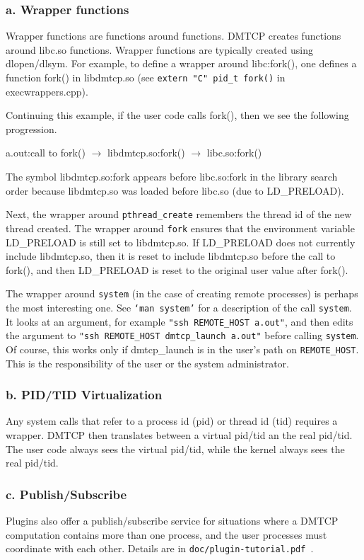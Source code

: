 \documentclass{article}
\begin{document}
\subsubsection*{a. Wrapper functions}

Wrapper functions are functions around functions.  DMTCP creates
functions around libc.so functions.
Wrapper functions
are typically created using dlopen/dlsym.  For example, to define
a wrapper around libc:fork(), one defines a function fork()
in libdmtcp.so (see {\tt extern "C" pid\_t fork()} in execwrappers.cpp).

Continuing this example, if the user code calls fork(), then we see
the following progression.

a.out:call to fork() $\longrightarrow$ libdmtcp.so:fork() $\longrightarrow$ libc.so:fork()

The symbol libdmtcp.so:fork appears before libc.so:fork in the
library search order because libdmtcp.so was loaded before libc.so
(due to LD\_PRELOAD).

Next, the wrapper around {\tt pthread\_create} remembers the thread id
of the new thread created.  The wrapper around {\tt fork} ensures
that the environment variable LD\_PRELOAD is still set to libdmtcp.so.
If LD\_PRELOAD does not currently include libdmtcp.so, then it is
reset to include libdmtcp.so before the call to fork(), and then
LD\_PRELOAD is reset to the original user value after fork().

The wrapper around {\tt system} (in the case of creating remote processes)
is perhaps the most interesting one.  See {\tt `man system'} for a description
of the call {\tt system}.  It looks at an argument, for example
{\tt "ssh REMOTE\_HOST a.out"}, and then edits the argument to
{\tt "ssh REMOTE\_HOST dmtcp\_launch a.out"} before calling {\tt system}.
Of course, this works only if dmtcp\_launch is in the user's path
on {\tt REMOTE\_HOST}.  This is the responsibility of the user or the
system administrator.

\subsubsection*{b. PID/TID Virtualization}

Any system calls that refer to a process id (pid) or thread id (tid) requires
a wrapper.  DMTCP then translates between a virtual pid/tid an the
real pid/tid.  The user code always sees the virtual pid/tid, while
the kernel always sees the real pid/tid.

\subsubsection*{c. Publish/Subscribe}

Plugins also offer a publish/subscribe service for situations where
a DMTCP computation contains more than one process, and the user
processes must coordinate with each other.  Details are in
{\tt doc/plugin-tutorial.pdf}~.
\end{document}
